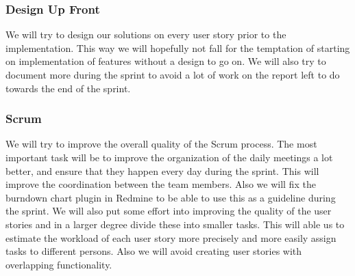 \subsubsection{Design Up Front}
We will try to design our solutions on every user story prior to the implementation. This way we will hopefully not fall for the temptation of starting on implementation of features without a design to go on. We will also try to document more during the sprint to avoid a lot of work on the report left to do towards the end of the sprint.

\subsubsection{Scrum}
We will try to improve the overall quality of the Scrum process. The most important task will be to improve the organization of the daily meetings a lot better, and ensure that they happen every day during the sprint. This will improve the coordination between the team members. Also we will fix the burndown chart plugin in Redmine to be able to use this as a guideline during the sprint. We will also put some effort into improving the quality of the user stories and in a larger degree divide these into smaller tasks. This will able us to estimate the workload of each user story more precisely and more easily assign tasks to different persons. Also we will avoid creating user stories with overlapping functionality.
